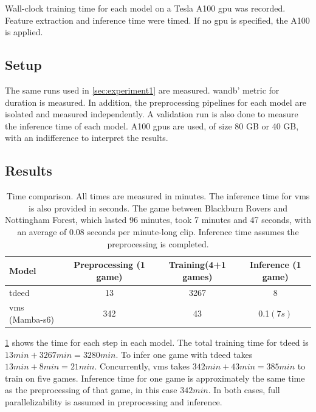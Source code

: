 Wall-clock training time for each model on a Tesla A100 \acrshort{gpu} was recorded. Feature extraction and inference time were timed. If no \acrshort{gpu} is specified, the A100 is applied. 

\subsection{Setup}
\label{ssec:ex2_setup}

The same runs used in \autoref{sec:experiment1} are measured. \acrlong{wandb}' metric for duration is measured. In addition, the preprocessing pipelines for each model are isolated and measured independently. A validation run is also done to measure the inference time of each model. A100 \acrshort{gpu}s are used, of size 80 GB or 40 GB, with an indifference to interpret the results. 

\subsection{Results}
\label{ssec:ex2_result}

\begin{table}
    \centering
    \begin{tabular}{lccc}
        \toprule 
        Model & Preprocessing (1 game)  & Training(4+1 games) & Inference (1 game) \\
        \midrule
        \acrshort{tdeed} & 13 & 3267 & 8\\
        \acrshort{vms} (Mamba-\acrshort{s6}) & 342 & 43 & 0.1$(7s)$ \\
        \bottomrule
    \end{tabular}
    \caption{Time comparison. All times are measured in minutes. The inference time for \acrshort{vms} is also provided in seconds. The game between Blackburn Rovers and Nottingham Forest, which lasted 96 minutes, took 7 minutes and 47 seconds, with an average of 0.08 seconds per minute-long clip. Inference time assumes the preprocessing is completed.}
    \label{tab:results_ex2}
\end{table}

\cref{tab:results_ex2} shows the time for each step in each model. The total training time for \acrshort{tdeed} is \(13min+3267min= 3280min\). To infer one game with \acrshort{tdeed} takes \(13min + 8min = 21min \). Concurrently, \acrshort{vms} takes \(342min+43min=385min\) to train on five games. Inference time for one game is approximately the same time as the preprocessing of that game, in this case \(342min\). In both cases, full parallelizability is assumed in preprocessing and inference. 


